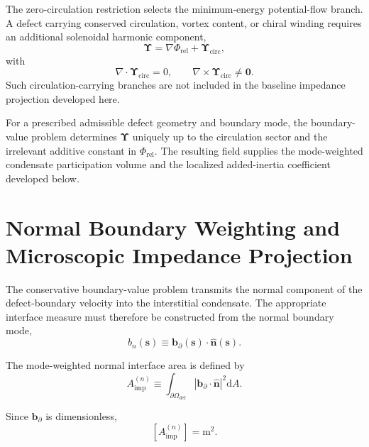 The zero-circulation restriction selects the minimum-energy potential-flow branch. A defect carrying conserved circulation, vortex content, or chiral winding requires an additional solenoidal harmonic component,
\begin{equation}
    \boldsymbol\Upsilon
    =
    \nabla\Phi_{\mathrm{rel}}
    +
    \boldsymbol\Upsilon_{\mathrm{circ}},
\end{equation}
with
\begin{equation}
    \nabla\cdot\boldsymbol\Upsilon_{\mathrm{circ}}=0,
    \qquad
    \nabla\times\boldsymbol\Upsilon_{\mathrm{circ}}\neq\mathbf 0.
\end{equation}
Such circulation-carrying branches are not included in the baseline impedance projection developed here.

For a prescribed admissible defect geometry and boundary mode, the boundary-value problem determines \(\boldsymbol\Upsilon\) uniquely up to the circulation sector and the irrelevant additive constant in \(\Phi_{\mathrm{rel}}\). The resulting field supplies the mode-weighted condensate participation volume and the localized added-inertia coefficient developed below.

\section{Normal Boundary Weighting and Microscopic Impedance Projection}
\label{sec:AP_normal_boundary_impedance}

The conservative boundary-value problem transmits the normal component of the defect-boundary velocity into the interstitial condensate. The appropriate interface measure must therefore be constructed from the normal boundary mode,
\begin{equation}
    b_n(\boldsymbol{s})
    \equiv
    \mathbf{b}_{\partial}(\boldsymbol{s})
    \cdot
    \hat{\mathbf{n}}(\boldsymbol{s}).
\end{equation}

The mode-weighted normal interface area is defined by
\begin{equation}
    A_{\mathrm{imp}}^{(n)}
    \equiv
    \int_{\partial\Omega_{\mathrm{def}}}
    \left|
    \mathbf{b}_{\partial}\cdot\hat{\mathbf{n}}
    \right|^2
    \mathrm{d}A .
\end{equation}

Since \(\mathbf{b}_{\partial}\) is dimensionless,
\begin{equation}
    \left[
    A_{\mathrm{imp}}^{(n)}
    \right]
    =
    \mathrm{m}^2 .
\end{equation}

